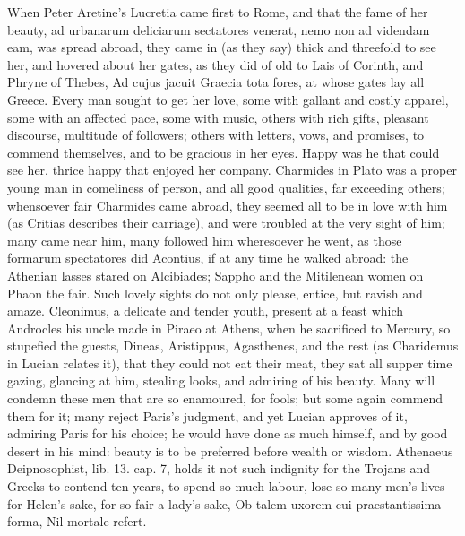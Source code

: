 {When Peter Aretine's Lucretia came first to Rome, and that the
fame of her beauty, ad urbanarum deliciarum sectatores venerat, nemo
non ad videndam eam, \etc{} was spread abroad, they came in (as they say)
thick and threefold to see her, and hovered about her gates, as they
did of old to Lais of Corinth, and Phryne of Thebes, Ad cujus
jacuit Graecia tota fores, at whose gates lay all Greece. Every
man sought to get her love, some with gallant and costly apparel, some
with an affected pace, some with music, others with rich gifts,
pleasant discourse, multitude of followers; others with letters, vows,
and promises, to commend themselves, and to be gracious in her eyes.
Happy was he that could see her, thrice happy that enjoyed her company.
Charmides in Plato was a proper young man in comeliness of
person, and all good qualities, far exceeding others; whensoever fair
Charmides came abroad, they seemed all to be in love with him (as
Critias describes their carriage), and were troubled at the very sight
of him; many came near him, many followed him wheresoever he went, as
those formarum spectatores did Acontius, if at any time he walked
abroad: the Athenian lasses stared on Alcibiades; Sappho and the
Mitilenean women on Phaon the fair. Such lovely sights do not only
please, entice, but ravish and amaze. Cleonimus, a delicate and tender
youth, present at a feast which Androcles his uncle made in Piraeo at
Athens, when he sacrificed to Mercury, so stupefied the guests, Dineas,
Aristippus, Agasthenes, and the rest (as Charidemus in Lucian
relates it), that they could not eat their meat, they sat all supper
time gazing, glancing at him, stealing looks, and admiring of his
beauty. Many will condemn these men that are so enamoured, for fools;
but some again commend them for it; many reject Paris's judgment, and
yet Lucian approves of it, admiring Paris for his choice; he would have
done as much himself, and by good desert in his mind: beauty is to be
preferred before wealth or wisdom. Athenaeus Deipnosophist,
lib. 13. cap. 7, holds it not such indignity for the Trojans and Greeks
to contend ten years, to spend so much labour, lose so many men's lives
for Helen's sake, for so fair a lady's sake,
Ob talem uxorem cui praestantissima forma,
Nil mortale refert.

}
